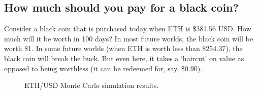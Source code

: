 
\subsection{How much should you pay for a black coin?}

Consider a black coin that is purchased today when ETH is \$381.56 USD. How much will it be worth in 100 days? In most future worlds, the black coin will be worth \$1. In some future worlds (when ETH is worth less than \$254.37), the black coin will break the buck. But even here, it takes a `haircut' on value as opposed to being worthless (\eg it can be redeemed for, say, \$0.90). 

\begin{figure}[t]
    \centering
        \qquad
    \caption{ETH/USD Monte Carlo simulation results. \label{fig:sim}}
\end{figure}

